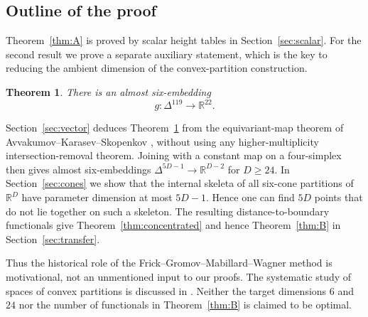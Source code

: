 \documentclass[a4paper,11pt,reqno]{amsart}
\newcommand{\R}{\mathbb R}
\newtheorem{mainthm}{Theorem}
\theoremstyle{definition}
\theoremstyle{remark}
\numberwithin{equation}{section}
\begin{document}
\subsection*{Outline of the proof}
Theorem~\ref{thm:A} is proved by scalar height tables in
Section~\ref{sec:scalar}. For the second result we prove a separate
auxiliary statement, which is the key to reducing the ambient
dimension of the convex-partition construction.

\begin{mainthm}\label{thm:C}
There is an almost six-embedding
\[
                         g:\Delta^{119}\longrightarrow\R^{22}.
\]
\end{mainthm}

Section~\ref{sec:vector} deduces Theorem~\ref{thm:C} from the
equivariant-map theorem of Avvakumov--Karasev--Skopenkov
\cite[Theorem 2.2]{AKS}, without using any higher-multiplicity
intersection-removal theorem. Joining with a constant map on a
four-simplex then gives almost six-embeddings
$\Delta^{5D-1}\to\R^{D-2}$ for $D\ge24$. In
Section~\ref{sec:cones} we show that the internal skeleta of all
six-cone partitions of $\R^D$ have parameter dimension at most
$5D-1$. Hence one can find $5D$ points that do not lie together
on such a skeleton. The resulting distance-to-boundary
functionals give Theorem~\ref{thm:concentrated} and hence Theorem~\ref{thm:B} in
Section~\ref{sec:transfer}.

Thus the historical role of the Frick--Gromov--Mabillard--Wagner
method is motivational, not an unmentioned input to our proofs.
The systematic study of spaces of convex partitions is discussed
in \cite{LZ}. Neither the target dimensions $6$ and $24$ nor the
number of functionals in Theorem~\ref{thm:B} is claimed to be
optimal.
\end{document}

